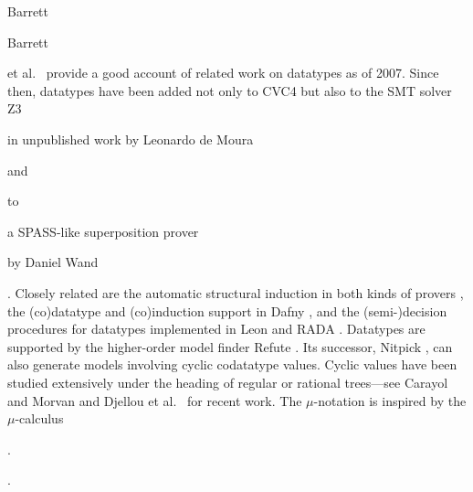 
\begin{rep} Barrett\end{rep}%
\begin{conf}Barrett\end{conf}
et al.\ \cite{barrett-et-al-2007} provide a good account of
related work on datatypes as of 2007. Since then, datatypes have been added not only to CVC4
but also to the SMT solver
Z3 \cite{de-moura-bjoerner-2008} \begin{rep}in unpublished work by Leonardo de Moura \end{rep}and \begin{rep}to \end{rep}a SPASS-like %
superposition prover \begin{rep}by Daniel Wand\end{rep} \cite{wand-2014}.
Closely related are the automatic structural
induction in both kinds of provers \cite{kersani-peltier-2013,cruanes-201x,wand-weidenbach-201x,reynolds-kuncak-2015},
the (co)datatype and (co)induction support in Dafny \cite{leino-moskal-2014},
and the (semi-)decision procedures for datatypes
implemented in Leon \cite{suter-et-al-2011} and RADA \cite{pham-et-al-2013}.
%
Datatypes are supported by the higher-order model finder Refute
\cite{weber-2008}. Its successor, Nitpick \cite{blanchette-nipkow-2010}, can
also generate models involving cyclic codatatype values.
Cyclic values have been studied extensively under the heading of
regular or rational trees---see Carayol and Morvan
\cite{carayol-morvan-2006} and Djellou et al.\ \cite{djelloul-et-al-2008}
for recent work.
The $\mu$-notation is inspired by the $\mu$-calculus
\begin{conf}\cite{kozen-1983}.\end{conf}
\begin{rep}\cite[etc.]{kozen-1983,endrullis-et-al-2011}.\end{rep}



%

